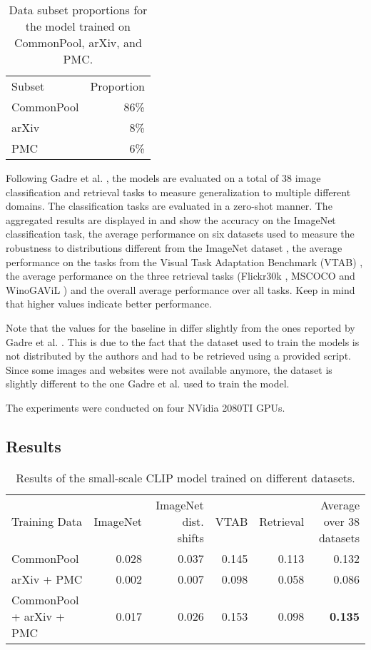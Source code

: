\begin{table}
	\centering
	\begin{tabular}{l r}
		Subset & Proportion \\
		CommonPool & 86\% \\
		arXiv & 8\% \\
		PMC & 6\%
	\end{tabular}
	\caption{Data subset proportions for the model trained on CommonPool, arXiv, and PMC.}
	\label{tab:data.weights}
\end{table}

Following Gadre et al. \cite{DBLP:journals/corr/abs-2304-14108}, the models are evaluated on a total of 38 image classification and retrieval tasks to measure generalization to multiple different domains. The classification tasks are evaluated in a zero-shot manner. The aggregated results are displayed in  and show the accuracy on the ImageNet classification task, the average performance on six datasets used to measure the robustness to distributions different from the ImageNet dataset \cite{DBLP:conf/nips/TaoriDSCRS20}, the average performance on the tasks from the Visual Task Adaptation Benchmark (VTAB) \cite{DBLP:journals/corr/abs-1910-04867}, the average performance on the three retrieval tasks (Flickr30k \cite{young-etal-2014-image}, MSCOCO \cite{DBLP:journals/corr/ChenFLVGDZ15} and WinoGAViL \cite{bitton2022winogavil}) and the overall average performance over all tasks. Keep in mind that higher values indicate better performance.

Note that the values for the baseline in  differ slightly from the ones reported by Gadre et al. \cite{DBLP:journals/corr/abs-2304-14108}. This is due to the fact that the dataset used to train the models is not distributed by the authors and had to be retrieved using a provided script. Since some images and websites were not available anymore, the dataset is slightly different to the one Gadre et al. \cite{DBLP:journals/corr/abs-2304-14108} used to train the model.

The experiments were conducted on four NVidia 2080TI GPUs.

\subsection{Results}

\begin{table*}
	\begin{tabular}{l r r r r r}
		Training Data & ImageNet & ImageNet dist. shifts & VTAB & Retrieval & Average over 38 datasets \\
		CommonPool \cite{DBLP:journals/corr/abs-2304-14108} & 0.028 & 0.037 & 0.145 & 0.113 & 0.132 \\
		arXiv + PMC & 0.002 & 0.007 & 0.098 & 0.058 & 0.086 \\
		CommonPool + arXiv + PMC & 0.017 & 0.026 & 0.153 & 0.098 & \textbf{0.135} \\
	\end{tabular}
	\caption{Results of the small-scale CLIP model trained on different datasets.}
	\label{tab:results}
\end{table*}

